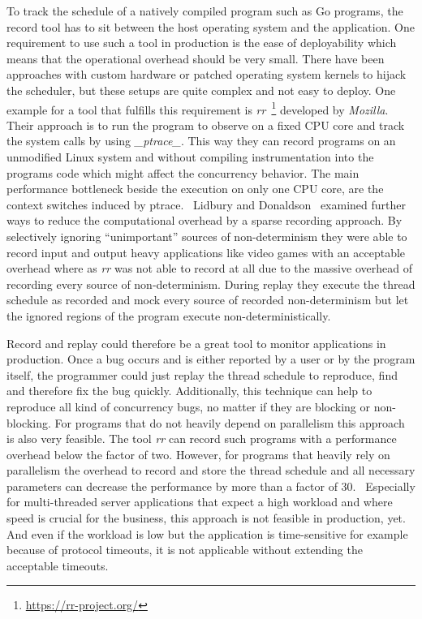 \documentclass[conference]{IEEEtran}
\begin{document}
To track the schedule of a natively compiled program such as Go programs, the record tool has to sit between the host operating system and the application.
One requirement to use such a tool in production is the ease of deployability which means that the operational overhead should be very small.
There have been approaches with custom hardware or patched operating system kernels to hijack the scheduler, but these setups are quite complex and not easy to deploy.
One example for a tool that fulfills this requirement is \emph{rr}~\footnote{\url{https://rr-project.org/}} developed by \emph{Mozilla}.
Their approach is to run the program to observe on a fixed CPU core and track the system calls by using \emph{\_ptrace\_}.
This way they can record programs on an unmodified Linux system and without compiling instrumentation into the programs code which might affect the concurrency behavior.
The main performance bottleneck beside the execution on only one CPU core, are the context switches induced by ptrace.~\cite{o2017engineering}
Lidbury and Donaldson~\cite{lidbury2019sparse} examined further ways to reduce the computational overhead by a sparse recording approach.
By selectively ignoring ``unimportant'' sources of non-determinism they were able to record input and output heavy applications like video games with an acceptable overhead where as \emph{rr} was not able to record at all due to the massive overhead of recording every source of non-determinism.
During replay they execute the thread schedule as recorded and mock every source of recorded non-determinism but let the ignored regions of the program execute non-deterministically.

Record and replay could therefore be a great tool to monitor applications in production.
Once a bug occurs and is either reported by a user or by the program itself, the programmer could just replay the thread schedule to reproduce, find and therefore fix the bug quickly.
Additionally, this technique can help to reproduce all kind of concurrency bugs, no matter if they are blocking or non-blocking.
For programs that do not heavily depend on parallelism this approach is also very feasible.
The tool \emph{rr} can record such programs with a performance overhead below the factor of two.
However, for programs that heavily rely on parallelism the overhead to record and store the thread schedule and all necessary parameters can decrease the performance by more than a factor of 30.~\cite{o2017engineering}
Especially for multi-threaded server applications that expect a high workload and where speed is crucial for the business, this approach is not feasible in production, yet.
And even if the workload is low but the application is time-sensitive for example because of protocol timeouts, it is not applicable without extending the acceptable timeouts.
\end{document}
